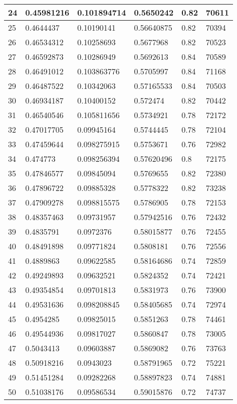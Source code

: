 \begin{longtable}{|l|l|l|l|l|l|}
24 & 0.45981216 & 0.101894714 & 0.5650242 & 0.82 & 70611 \\ \hline 
25 & 0.4644437 & 0.10190141 & 0.56640875 & 0.82 & 70394 \\ \hline 
26 & 0.46534312 & 0.10258693 & 0.5677968 & 0.82 & 70523 \\ \hline 
27 & 0.46592873 & 0.10286949 & 0.5692613 & 0.84 & 70589 \\ \hline 
28 & 0.46491012 & 0.103863776 & 0.5705997 & 0.84 & 71168 \\ \hline 
29 & 0.46487522 & 0.10342063 & 0.57165533 & 0.84 & 70503 \\ \hline 
30 & 0.46934187 & 0.10400152 & 0.572474 & 0.82 & 70442 \\ \hline 
31 & 0.46540546 & 0.105811656 & 0.5734921 & 0.78 & 72172 \\ \hline 
32 & 0.47017705 & 0.09945164 & 0.5744445 & 0.78 & 72104 \\ \hline 
33 & 0.47459644 & 0.098275915 & 0.5753671 & 0.76 & 72982 \\ \hline 
34 & 0.474773 & 0.098256394 & 0.57620496 & 0.8 & 72175 \\ \hline 
35 & 0.47846577 & 0.09845094 & 0.5769655 & 0.82 & 72380 \\ \hline 
36 & 0.47896722 & 0.09885328 & 0.5778322 & 0.82 & 73238 \\ \hline 
37 & 0.47909278 & 0.098815575 & 0.5786905 & 0.78 & 72153 \\ \hline 
38 & 0.48357463 & 0.09731957 & 0.57942516 & 0.76 & 72432 \\ \hline 
39 & 0.4835791 & 0.0972376 & 0.58015877 & 0.76 & 72455 \\ \hline 
40 & 0.48491898 & 0.09771824 & 0.5808181 & 0.76 & 72556 \\ \hline 
41 & 0.4889863 & 0.09622585 & 0.58164686 & 0.74 & 72859 \\ \hline 
42 & 0.49249893 & 0.09632521 & 0.5824352 & 0.74 & 72421 \\ \hline 
43 & 0.49354854 & 0.09701813 & 0.5831973 & 0.76 & 73900 \\ \hline 
44 & 0.49531636 & 0.098208845 & 0.58405685 & 0.74 & 72974 \\ \hline 
45 & 0.4954285 & 0.09825015 & 0.5851263 & 0.78 & 74461 \\ \hline 
46 & 0.49544936 & 0.09817027 & 0.5860847 & 0.78 & 73005 \\ \hline 
47 & 0.5043413 & 0.09603887 & 0.5869082 & 0.76 & 73763 \\ \hline 
48 & 0.50918216 & 0.0943023 & 0.58791965 & 0.72 & 75221 \\ \hline 
49 & 0.51451284 & 0.09282268 & 0.58897823 & 0.74 & 74881 \\ \hline 
50 & 0.51038176 & 0.09586534 & 0.59015876 & 0.72 & 74737 \\ \hline 
\end{longtable}